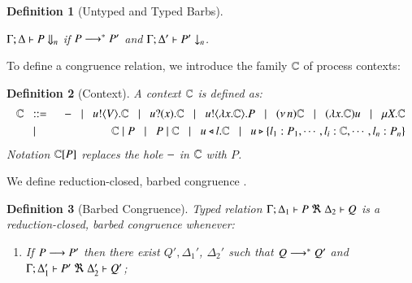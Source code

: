 \documentclass[preprint,11pt]{elsarticle}
\newtheorem{definition}{Definition}[section]
\begin{document}
{\begin{definition}[Untyped and Typed Barbs]
\begin{enumerate}[1.]
			$\Gamma; \Delta \vdash P \Downarrow_{n}$ if $P \longrightarrow^* P'$ and
			$\Gamma; \Delta' \vdash P' \downarrow_{n}$.			
	\end{enumerate}
\end{definition}



To define a congruence relation, we introduce the family ${\mathbb{C}}$ of process contexts:

\begin{definition}[Context]
	A context ${\mathbb{C}}$ is defined as:
\begin{eqnarray*}
		{\mathbb{C}} & \;\;::=\;\; &  - \;\;\;|\;\;\; u ! \langle V \rangle . {\mathbb{C}} \;\;\;|\;\;\; u ? (x) . {\mathbb{C}} \;\;\;|\;\;\; u ! \langle \lambda x.{\mathbb{C}} \rangle . P \;\;\;|\;\;\; (\nu\, n) {\mathbb{C}}
		\;\;\;|\;\;\; (\lambda x.{\mathbb{C}})u \;\;\;|\;\;\; \mu X. {\mathbb{C}}  
		\\
		& \;\;\;|\;\;\; &  {\mathbb{C}} \;|\; P \;\;\;|\;\;\; P \;|\; {\mathbb{C}} \;\;\;|\;\;\; u \triangleleft l . {\mathbb{C}} \;\;\;|\;\;\; u \triangleright \{l_1:P_1,\cdots,l_i:{\mathbb{C}},\cdots,l_n:P_n\} 
	\end{eqnarray*}
Notation ${\mathbb{C}}[P]$ replaces 
the hole $-$ in ${\mathbb{C}}$ with $P$.
\end{definition}


We define reduction-closed, barbed congruence \cite{HondaKYoshida95}. 


\begin{definition}[Barbed Congruence]
\label{def:rc}
	Typed relation
	$\horel{\Gamma}{\Delta_1}{P}{\ \Re\ }{\Delta_2}{Q}$
	is a {\em reduction-closed, barbed congruence} whenever:
	\begin{enumerate}[1.]
		\item	If $P \longrightarrow P'$ then there exist $Q', \Delta_1'$,  $\Delta_2'$ such that $Q \longrightarrow^* Q'$ and
			$\horel{\Gamma}{\Delta_1'}{P'}{\ \Re\ }{\Delta_2'}{Q'}$; 


\end{enumerate}
\end{definition}}
\end{document}
